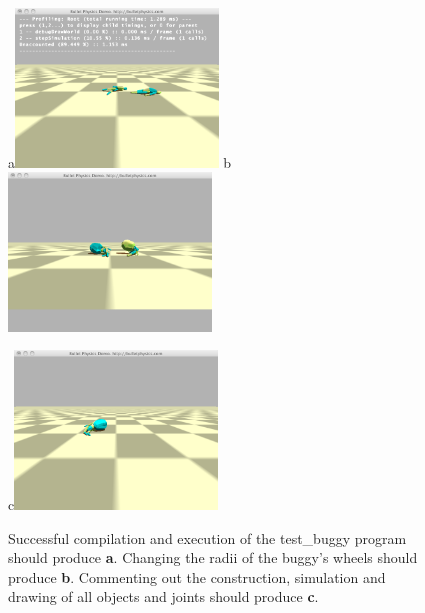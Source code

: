 \documentclass[12pt]{article}
\begin{document}
\begin{figure}[!t]
\centerline{
a\includegraphics[width=0.48\textwidth]{Fig1a}
b\includegraphics[width=0.48\textwidth]{Fig1b}
}
\centerline{
c\includegraphics[width=0.48\textwidth]{Fig1c}
}
\caption{
Successful compilation and execution of the test\_buggy program should produce \textbf{a}.
Changing the radii of the buggy's wheels should produce \textbf{b}.
Commenting out the construction, simulation and drawing of all objects and joints should produce \textbf{c}.}
\label{Fig}
\end{figure}
\end{document}
